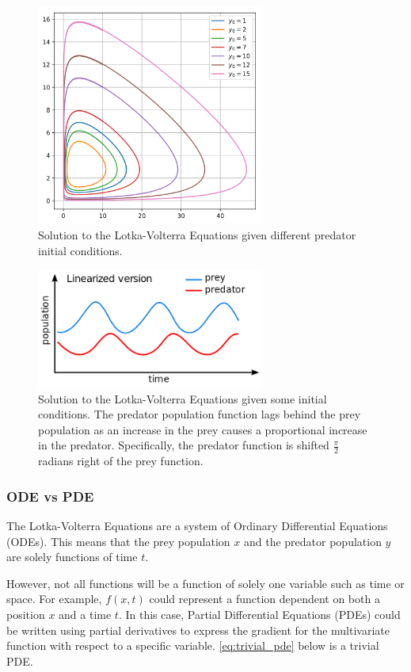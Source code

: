 \begin{figure}[H]
    \centering
    \includegraphics[width=75mm,height=\textheight,keepaspectratio]{images/Predator_prey_dynamics.png}
    \caption{Solution to the Lotka-Volterra Equations given different predator initial conditions.}
    \label{fig:lotka_volterra_phase}
\end{figure}

\begin{figure}[H]
    \centering
    \includegraphics[width=75mm,height=\textheight,keepaspectratio]{images/Lotka_Volterra_dynamics.png}
    \caption{Solution to the Lotka-Volterra Equations given some initial conditions. The predator population function lags behind the prey population as an increase in the prey causes a proportional increase in the predator. Specifically, the predator function is shifted $\frac{\pi}{2}$ radians right of the prey function.}
    \label{fig:lotka_volterra_init}
\end{figure}

\subsubsection{ODE vs PDE}
The Lotka-Volterra Equations are a system of Ordinary Differential Equations (ODEs). This means that the prey population \(x\) and the predator population \(y\) are solely functions of time \(t\).

However, not all functions will be a function of solely one variable such as time or space. For example, \(f(x, t)\) could represent a function dependent on both a position \(x\) and a time \(t\). In this case, Partial Differential Equations (PDEs) could be written using partial derivatives to express the gradient for the multivariate function with respect to a specific variable. \cref{eq:trivial_pde} below is a trivial PDE.


